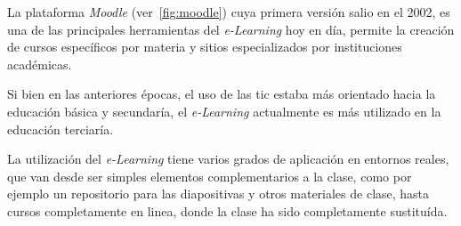 La plataforma \emph{Moodle} (ver~\ref{fig:moodle}) cuya primera versión salio en
el 2002, es una de las principales herramientas del \emph{e-Learning} hoy en
día, permite la creación de cursos específicos por materia y sitios
especializados por instituciones académicas\cite{perkins2006using}. 

Si bien en las anteriores épocas, el uso de las \Gls{tic} estaba más orientado
hacia la educación básica y secundaría, el \emph{e-Learning} actualmente es más
utilizado en la educación terciaría\cite{punie:ict}.

La utilización del \emph{e-Learning} tiene varios grados de aplicación en
entornos reales\cite{punie:ict}, que van desde ser simples elementos
complementarios a la clase, como por ejemplo un repositorio para las
diapositivas y otros materiales de clase, hasta cursos completamente en linea,
donde la clase ha sido completamente sustituída.
